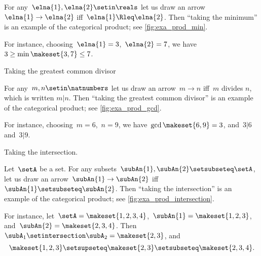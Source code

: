 \begin{example}
    \label{exa:min-as-prod}
    For any~$\elna{1},\elna{2}\setin \reals$ let us draw an arrow~$\elna{1}\to \elna{2}$ iff~$\elna{1}\Rleq \elna{2}$.
    Then ``taking the minimum'' is an example of the categorical product; see \cref{fig:exa_prod_min}.

    For instance, choosing~$\elna{1} = 3$,~$\elna{2} = 7$, we have~$3 \geq \min \makeset{3, 7} \leq 7$.
\end{example}

\begin{marginfigure}
    \centering
    \caption{Taking the greatest common divisor}
    \label{fig:exa_prod_gcd}
\end{marginfigure}

\begin{example}
    \label{exa:gcd-as-prod}
    For any~$m, n \setin \natnumbers$ let us draw an arrow~$m \to n$ iff~$m$ divides $n$, which is written $m | n$.
    Then ``taking the greatest common divisor'' is an example of the categorical product; see \cref{fig:exa_prod_gcd}.

    For instance, choosing~$m = 6$,~$n = 9$, we have~$\gcd \makeset{6, 9 } = 3$, and~$3 | 6$ and~$3 | 9$.
\end{example}

\begin{marginfigure}
    \centering
    \caption{Taking the intersection.}
    \label{fig:exa_prod_intersection}
\end{marginfigure}

\begin{example}
    \label{exa:intersection-as-prod}
    Let~$\setA$ be a set.
    For any subsets~$\subAn{1}, \subAn{2} \setsubseteq \setA$, let us draw an arrow~$\subAn{1} \to \subAn{2}$ iff~$\subAn{1} \setsubseteq \subAn{2}$.
    Then ``taking the intersection'' is an example of the categorical product; see \cref{fig:exa_prod_intersection}.

    For instance, let~$\setA = \makeset{ 1, 2, 3, 4 }$,~$\subAn{1} = \makeset{ 1, 2, 3 }$, and~$\subAn{2} = \makeset{2, 3, 4 }$.
    Then~$\subA_1 \setintersection \subA_2 = \makeset{2, 3 }$, and
    \begin{equation*}
        \makeset{ 1, 2, 3 } \setsupseteq \makeset{2, 3 } \setsubseteq \makeset{2, 3, 4 }.
    \end{equation*}
\end{example}

